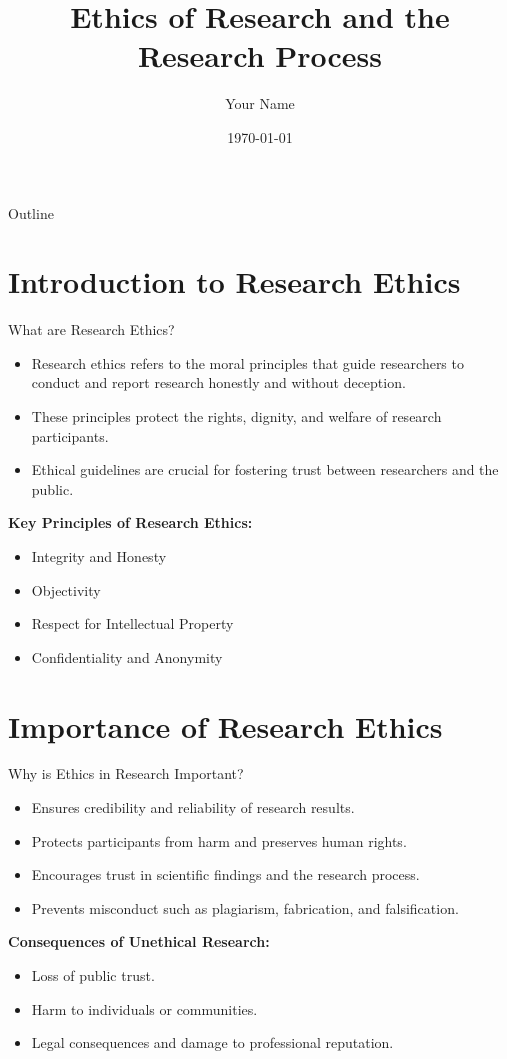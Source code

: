 \documentclass{beamer}
\title{Ethics of Research and the Research Process}
\author{Your Name}
\institute{Your Institution}
\date{\today}
\begin{document}
	
	\begin{frame}
		\titlepage
	\end{frame}
	
	\begin{frame}{Outline}
		\tableofcontents
	\end{frame}
	
	\section{Introduction to Research Ethics}
	\begin{frame}{What are Research Ethics?}
		\begin{itemize}
			\item Research ethics refers to the moral principles that guide researchers to conduct and report research honestly and without deception.
			\item These principles protect the rights, dignity, and welfare of research participants.
			\item Ethical guidelines are crucial for fostering trust between researchers and the public.
		\end{itemize}
		\vspace{0.5cm}
		\textbf{Key Principles of Research Ethics:}
		\begin{itemize}
			\item Integrity and Honesty
			\item Objectivity
			\item Respect for Intellectual Property
			\item Confidentiality and Anonymity
		\end{itemize}
	\end{frame}
	
	\section{Importance of Research Ethics}
	\begin{frame}{Why is Ethics in Research Important?}
		\begin{itemize}
			\item Ensures credibility and reliability of research results.
			\item Protects participants from harm and preserves human rights.
			\item Encourages trust in scientific findings and the research process.
			\item Prevents misconduct such as plagiarism, fabrication, and falsification.
		\end{itemize}
		\vspace{0.5cm}
		\textbf{Consequences of Unethical Research:}
		\begin{itemize}
			\item Loss of public trust.
			\item Harm to individuals or communities.
			\item Legal consequences and damage to professional reputation.
		\end{itemize}
	\end{frame}
	
\end{document}
